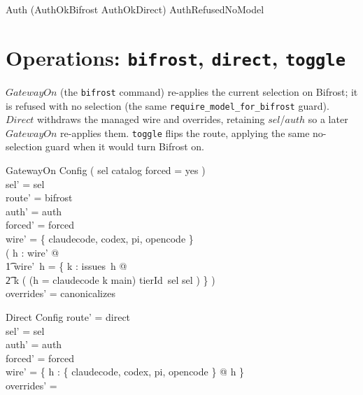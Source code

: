 \documentclass{article}
\begin{document}

\begin{zed}
  Auth  (AuthOkBifrost \lor AuthOkDirect) \lor AuthRefusedNoModel
\end{zed}

\section{Operations: \texttt{bifrost}, \texttt{direct}, \texttt{toggle}}

$GatewayOn$ (the \texttt{bifrost} command) re-applies the current selection on
Bifrost; it is refused with no selection (the same
\texttt{require\_model\_for\_bifrost} guard). $Direct$ withdraws the managed
wire and overrides, retaining $sel$/$auth$ so a later $GatewayOn$ re-applies
them. \texttt{toggle} flips the route, applying the same no-selection guard
when it would turn Bifrost on.

\begin{schema}{GatewayOn}
  \Delta Config
\where
  ( sel \in catalog \lor forced = yes ) \\
  sel' = sel \\
  route' = bifrost \\
  auth' = auth \\
  forced' = forced \\
  \dom wire' = \{ claudecode, codex, pi, opencode \} \\
  ( \forall h : \dom wire' @ \\
  \t1 wire'~h = \{ k : issues~h @ \\
  \t2   k \mapsto ( \IF (h = claudecode \land k \neq main) \THEN tierId~sel \ELSE sel ) \} ) \\
  overrides' = canonicalizes
\end{schema}

\begin{schema}{Direct}
  \Delta Config
\where
  route' = direct \\
  sel' = sel \\
  auth' = auth \\
  forced' = forced \\
  wire' = \{ h : \{ claudecode, codex, pi, opencode \} @ h \mapsto \emptyset \} \\
  overrides' = \emptyset
\end{schema}
\end{document}
